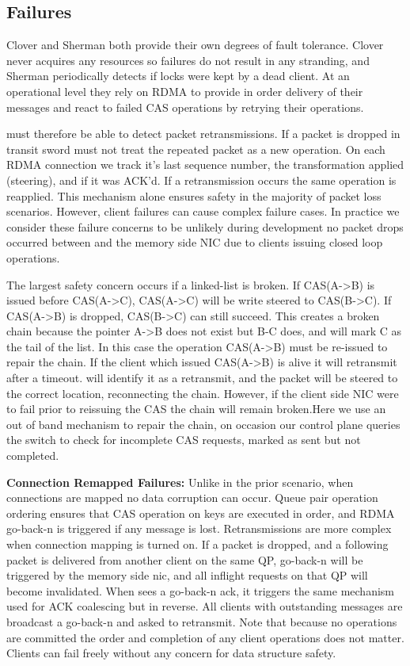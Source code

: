 \subsection{Failures}

Clover and Sherman both provide their own degrees of fault tolerance. Clover
never acquires any resources so failures do not result in any stranding, and
Sherman periodically detects if locks were kept by a dead client. At an
operational level they rely on RDMA to provide in order delivery of their
messages and react to failed CAS operations by retrying their operations.

{\sword} must therefore be able to detect packet retransmissions. If a packet is
dropped in transit sword must not treat the repeated packet as a new operation.
On each RDMA connection we track it's last sequence number, the transformation
{\sword} applied (steering), and if it was ACK'd.  If a retransmission occurs
the same operation is reapplied. This mechanism alone ensures safety in the
majority of packet loss scenarios. However, client failures can cause complex
failure cases.  In practice we consider these failure concerns to be unlikely
during development no packet drops occurred between {\sword} and the memory side
NIC due to clients issuing closed loop operations.


The largest safety concern occurs if a linked-list is broken.  If CAS(A->B) is
issued before CAS(A->C), CAS(A->C) will be write steered to CAS(B->C). If
CAS(A->B) is dropped, CAS(B->C) can still succeed. This creates a broken chain
because the pointer A->B does not exist but B-C does, and {\sword} will mark C
as the tail of the list. In this case the operation CAS(A->B) must be re-issued
to repair the chain.  If the client which issued CAS(A->B) is alive it will
retransmit after a timeout. {\sword} will identify it as a retransmit, and the
packet will be steered to the correct location, reconnecting the chain. However,
if the client side NIC were to fail prior to reissuing the CAS the chain will
remain broken.Here we use an out of band mechanism to repair the chain, on
occasion our control plane queries the switch to check for incomplete CAS
requests, marked as sent but not completed.

\textbf{Connection Remapped Failures:} Unlike in the prior scenario, when
connections are mapped no data corruption can occur. Queue pair operation
ordering ensures that CAS operation on keys are executed in order, and RDMA
go-back-n is triggered if any message is lost.  Retransmissions are more complex
when connection mapping is turned on. If a packet is dropped, and a following
packet is delivered from another client on the same QP, go-back-n will be
triggered by the memory side nic, and all inflight requests on that QP will
become invalidated. When {\sword} sees a go-back-n ack, it triggers the same
mechanism used for ACK coalescing but in reverse. All clients with outstanding
messages are broadcast a go-back-n and asked to retransmit. Note that because no
operations are committed the order and completion of any client operations does
not matter. Clients can fail freely without any concern for data structure
safety.


